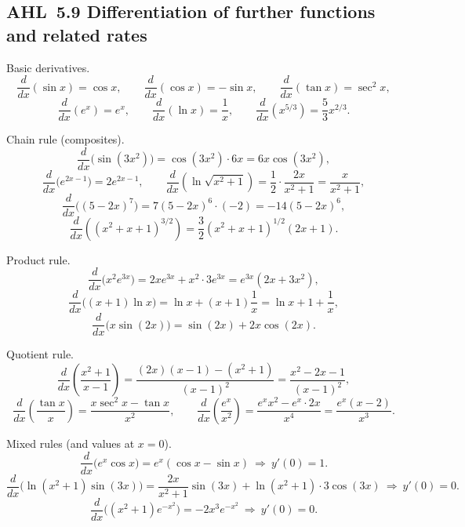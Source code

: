 \documentclass[11pt]{article}
\def\textbf#1{#1}%
\newcommand{\tocsubsection}[1]{\subsection{#1}}
\begin{document}
\tocsubsection{AHL 5.9 \; Differentiation of further functions and related rates}





\begin{solution}
\textbf{Basic derivatives.}
\[
\frac{d}{dx}(\sin x)=\cos x,\qquad
\frac{d}{dx}(\cos x)=-\sin x,\qquad
\frac{d}{dx}(\tan x)=\sec^{2}x,
\]
\[
\frac{d}{dx}(e^{x})=e^{x},\qquad
\frac{d}{dx}(\ln x)=\frac{1}{x},\qquad
\frac{d}{dx}\!\left(x^{5/3}\right)=\frac{5}{3}x^{2/3}.
\]
\end{solution}

\begin{solution}
\textbf{Chain rule (composites).}
\[
\frac{d}{dx}\big(\sin(3x^{2})\big)=\cos(3x^{2})\cdot 6x=6x\cos(3x^{2}),
\]
\[
\frac{d}{dx}\big(e^{2x-1}\big)=2e^{2x-1},
\qquad
\frac{d}{dx}\!\left(\ln\!\sqrt{x^{2}+1}\right)=\frac{1}{2}\cdot\frac{2x}{x^{2}+1}=\frac{x}{x^{2}+1},
\]
\[
\frac{d}{dx}\big((5-2x)^{7}\big)=7(5-2x)^{6}\cdot(-2)=-14(5-2x)^{6},
\]
\[
\frac{d}{dx}\!\left((x^{2}+x+1)^{3/2}\right)=\frac{3}{2}(x^{2}+x+1)^{1/2}(2x+1).
\]
\end{solution}

\begin{solution}
\textbf{Product rule.}
\[
\frac{d}{dx}\big(x^{2}e^{3x}\big)=2xe^{3x}+x^{2}\cdot 3e^{3x}=e^{3x}(2x+3x^{2}),
\]
\[
\frac{d}{dx}\big((x+1)\ln x\big)=\ln x+(x+1)\frac{1}{x}=\ln x+1+\frac{1}{x},
\]
\[
\frac{d}{dx}\big(x\sin(2x)\big)=\sin(2x)+2x\cos(2x).
\]
\end{solution}

\begin{solution}
\textbf{Quotient rule.}
\[
\frac{d}{dx}\!\left(\frac{x^{2}+1}{x-1}\right)
=\frac{(2x)(x-1)-(x^{2}+1)}{(x-1)^{2}}
=\frac{x^{2}-2x-1}{(x-1)^{2}},
\]
\[
\frac{d}{dx}\!\left(\frac{\tan x}{x}\right)=\frac{x\sec^{2}x-\tan x}{x^{2}},
\qquad
\frac{d}{dx}\!\left(\frac{e^{x}}{x^{2}}\right)
=\frac{e^{x}x^{2}-e^{x}\cdot 2x}{x^{4}}
=\frac{e^{x}(x-2)}{x^{3}}.
\]
\end{solution}

\begin{solution}
\textbf{Mixed rules (and values at $x=0$).}
\[
\frac{d}{dx}\big(e^{x}\cos x\big)=e^{x}(\cos x-\sin x)\ \Rightarrow\ y'(0)=1.
\]
\[
\frac{d}{dx}\big(\ln(x^{2}+1)\sin(3x)\big)=\frac{2x}{x^{2}+1}\sin(3x)+\ln(x^{2}+1)\cdot 3\cos(3x)\ \Rightarrow\ y'(0)=0.
\]
\[
\frac{d}{dx}\big((x^{2}+1)e^{-x^{2}}\big)=-2x^{3}e^{-x^{2}}\ \Rightarrow\ y'(0)=0.
\]
\end{solution}
\end{document}

